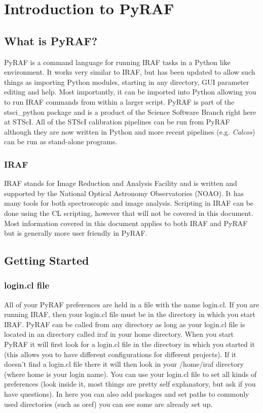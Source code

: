 \chapter{Introduction to PyRAF}
\label{cha:chapter2}


 
\section{What is PyRAF? }
PyRAF is a command language for running IRAF tasks in a Python like environment. It works very similar to IRAF, but has been updated to allow such things as importing Python modules, starting in any directory, GUI parameter editing and help. Most importantly, it can be imported into Python allowing you to run IRAF commands from within a larger script. PyRAF is part of the stsci\_python package and is a product of the Science Software Branch right here at STScI. All of the STScI calibration pipelines can be run from PyRAF although they are now written in Python and more recent pipelines (e.g. \emph{Calcos}) can be run as stand-alone programs.

\subsection{IRAF}
IRAF stands for Image Reduction and Analysis Facility and is written and supported by the National Optical Astronomy Observatories (NOAO). It has many tools for both spectroscopic and image analysis. Scripting in IRAF can be done using the CL scripting, however that will not be covered in this document. Most information covered in this document applies to both IRAF and PyRAF but is generally more user friendly in PyRAF.

\section{Getting Started}
\subsection{login.cl file}
All of your PyRAF preferences are held in a file with the name login.cl.  If you are running IRAF, then your login.cl file must be in the directory in which you start IRAF. PyRAF can be called from any directory as long as your login.cl file is located in an directory called iraf in your home directory. When you start PyRAF it will first look for a login.cl file in the directory in which you started it (this allows you to have different configurations for different projects). If it doesn't find a login.cl file there it will then look in your /home/iraf directory (where home is your login name). You can use your login.cl file to set all kinds of preferences (look inside it, most things are pretty self explanatory, but ask if you have questions). In here you can also add packages and set paths to commonly used directories (such as oref) you can see some are already set up.


